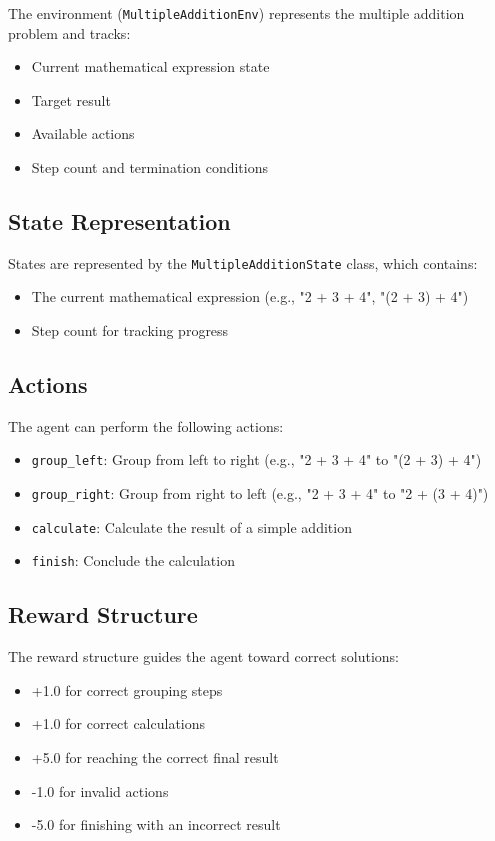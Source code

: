 \documentclass{article}
\begin{document}
The environment (\texttt{MultipleAdditionEnv}) represents the multiple addition problem and tracks:
\begin{itemize}
    \item Current mathematical expression state
    \item Target result
    \item Available actions
    \item Step count and termination conditions
\end{itemize}

\subsection{State Representation}

States are represented by the \texttt{MultipleAdditionState} class, which contains:
\begin{itemize}
    \item The current mathematical expression (e.g., "2 + 3 + 4", "(2 + 3) + 4")
    \item Step count for tracking progress
\end{itemize}

\subsection{Actions}

The agent can perform the following actions:
\begin{itemize}
    \item \texttt{group\_left}: Group from left to right (e.g., "2 + 3 + 4" to "(2 + 3) + 4")
    \item \texttt{group\_right}: Group from right to left (e.g., "2 + 3 + 4" to "2 + (3 + 4)")
    \item \texttt{calculate}: Calculate the result of a simple addition
    \item \texttt{finish}: Conclude the calculation
\end{itemize}

\subsection{Reward Structure}

The reward structure guides the agent toward correct solutions:
\begin{itemize}
    \item +1.0 for correct grouping steps
    \item +1.0 for correct calculations
    \item +5.0 for reaching the correct final result
    \item -1.0 for invalid actions
    \item -5.0 for finishing with an incorrect result
\end{itemize}
\end{document}
